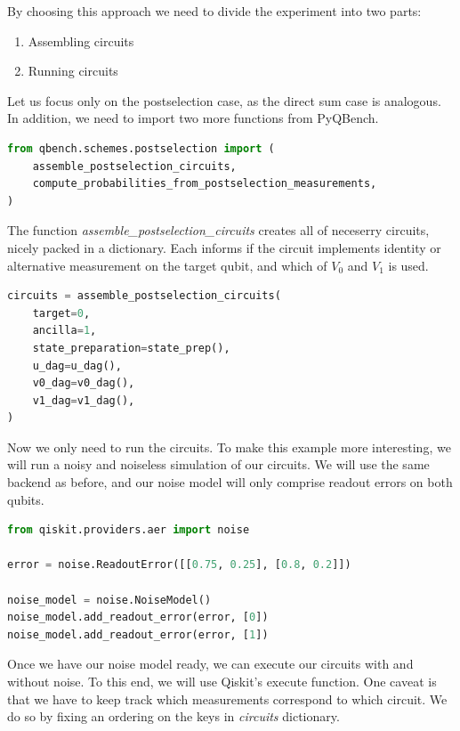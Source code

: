 \documentclass[preprint,12pt, a4paper, dvipsnames]{elsarticle}
\newcommand{\1}{{\rm 1\hspace{-0.9mm}l}}
\begin{document}
By choosing this approach we need to divide the experiment into two parts:
\begin{enumerate}
	\item Assembling  circuits
	\item Running  circuits
\end{enumerate}
Let us focus only on the postselection case, as the direct sum case is analogous. In addition, we need to import two more functions from PyQBench.
\begin{lstlisting}[language=Python, caption=Assembling circuits]
from qbench.schemes.postselection import (
	assemble_postselection_circuits,
	compute_probabilities_from_postselection_measurements,
)
\end{lstlisting}
The function \textit{assemble\_postselection\_circuits} creates all of neceserry circuits, nicely packed in a dictionary. Each informs if the circuit implements identity or alternative measurement on the target qubit, and which of $V_0$ and
$V_1$ is used.
\begin{lstlisting}[language=Python]
circuits = assemble_postselection_circuits(
	target=0,
	ancilla=1,
	state_preparation=state_prep(),
	u_dag=u_dag(),
	v0_dag=v0_dag(),
	v1_dag=v1_dag(),
)

\end{lstlisting}
%
Now we only need to run the circuits.
To make this example more interesting, we will run a noisy and noiseless simulation of our circuits. We will use the same backend as before, and our noise model will only comprise readout errors on both qubits.
\begin{lstlisting}[language=Python, caption=Noise models]
from qiskit.providers.aer import noise

error = noise.ReadoutError([[0.75, 0.25], [0.8, 0.2]])

noise_model = noise.NoiseModel()
noise_model.add_readout_error(error, [0])
noise_model.add_readout_error(error, [1])
\end{lstlisting}
Once we have our noise model ready, we can execute our circuits with and without noise. To this end, we will use Qiskit’s execute function. One caveat is that we have to keep track which measurements correspond to which circuit. We do so by fixing an ordering on the keys in \textit{circuits} dictionary.
\end{document}
